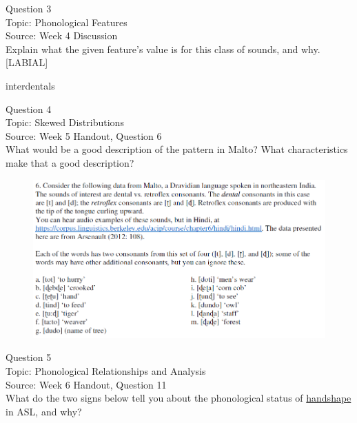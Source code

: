 \documentclass[12pt]{article}
\begin{document}
\newpage

{\large Question 3}\\

Topic: Phonological Features\\
Source: Week 4 Discussion\\

Explain what the given feature’s value is for this class of sounds, and why.\\

{[LABIAL]}

interdentals


\newpage

{\large Question 4}\\

Topic: Skewed Distributions\\
Source: Week 5 Handout, Question 6\\

What would be a good description of the pattern in Malto? What characteristics make that a good description?\\

\begin{figure}[H]
\includegraphics{../images/malto.png}
\end{figure}

\newpage

{\large Question 5}\\

Topic: Phonological Relationships and Analysis\\
Source: Week 6 Handout, Question 11\\

What do the two signs below tell you about the phonological status of \underline{handshape} in ASL, and why?\\
\end{document}
